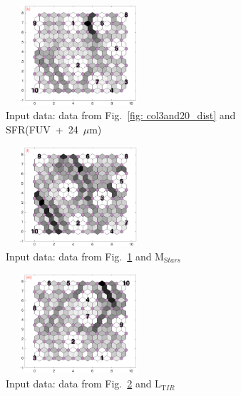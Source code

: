 \begin{figure}
    \begin{subfigure}[b]{0.25\textwidth}
        \centering
        \includegraphics[width=54mm, height=37mm]{../../images0.01/M31/2D/diff_dimension/combine_2D_data_between_cols3and21.png}
        \caption{Input data: data from Fig.~\ref{fig: col3and20_dist} and SFR(FUV\ +\ 24\ $\mu$m)}
        \label{fig: col3and21_dist}
    \end{subfigure}
            \hfill
    \begin{subfigure}[b]{0.25\textwidth}
        \centering
        \includegraphics[width=54mm, height=37mm]{../../images0.01/M31/2D/diff_dimension/combine_2D_data_between_cols3and22.png}
        \caption{Input data: data from Fig.~\ref{fig: col3and21_dist} and M$_{{\mathrm Stars}}$}
        \label{fig: col3and22_dist}
    \end{subfigure}
            \hfill
    \begin{subfigure}[b]{0.25\textwidth}
        \centering
        \includegraphics[width=54mm, height=37mm]{../../images0.01/M31/2D/diff_dimension/combine_2D_data_between_cols3and23.png}
        \caption{Input data: data from Fig.~\ref{fig: col3and22_dist} and L$_{{\mathrm TIR}}$}
        \label{fig: col3and23_dist}
    \end{subfigure}
            \hfill
    \begin{subfigure}[b]{0.25\textwidth}
        \centering

\end{subfigure}
\end{figure}
